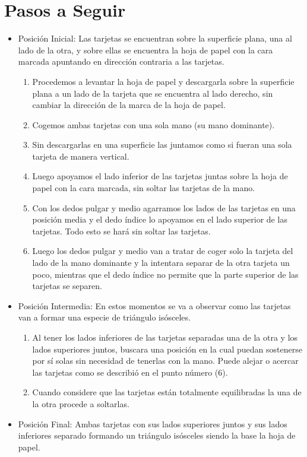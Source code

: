 \documentclass{article}
\begin{document}
\section{Pasos a Seguir} \label{pasos}
\begin{itemize}
    \item Posición Inicial: Las tarjetas se encuentran sobre la superficie plana, una al lado de la otra, y sobre ellas se encuentra la hoja de papel con la cara marcada apuntando en dirección contraria a las tarjetas.
    \begin{enumerate}
        \item Procedemos a levantar la hoja de papel y descargarla sobre la superficie plana a un lado de la tarjeta que se encuentra al lado derecho, sin cambiar la dirección de la marca de la hoja de papel.
        \item Cogemos ambas tarjetas con una sola mano (su mano dominante).
        \item Sin descargarlas en una superficie las juntamos como si fueran una sola tarjeta de manera vertical.
        \item Luego apoyamos el lado inferior de las tarjetas juntas sobre la hoja de papel con la cara marcada, sin soltar las tarjetas de la mano.
        \item Con los dedos pulgar y medio agarramos los lados de las tarjetas en una posición media y el dedo índice lo apoyamos en el lado superior de las tarjetas. Todo esto se hará sin soltar las tarjetas.
        \item Luego los dedos pulgar y medio van a tratar de coger solo la tarjeta del lado de la mano dominante y la intentara separar de la otra tarjeta un poco, mientras que el dedo índice no permite que la parte superior de las tarjetas se separen.
    \end{enumerate}
    \item Posición Intermedia: En estos momentos se va a observar como las tarjetas van a formar una especie de triángulo isósceles.
    \begin{enumerate}
        \item Al tener los lados inferiores de las tarjetas separadas una de la otra y los lados superiores juntos, buscara una posición en la cual puedan sostenerse por sí solas sin necesidad de tenerlas con la mano. Puede alejar o acercar las tarjetas como se describió en el punto número (6).
        \item Cuando considere que las tarjetas están totalmente equilibradas la una de la otra procede a soltarlas.
    \end{enumerate}
    \item Posición Final: Ambas tarjetas con sus lados superiores juntos y sus lados inferiores separado formando un triángulo isósceles siendo la base la hoja de papel.
\end{itemize}
\end{document}
